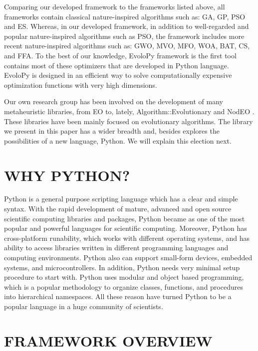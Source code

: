 \documentclass[a4paper,twoside]{article}
\begin{document}
Comparing our developed framework to the frameworks listed above, all
frameworks contain classical nature-inspired algorithms such as: GA,
GP, PSO and ES. Whereas, in our developed framework, in addition to
well-regarded and popular nature-inspired algorithms such as PSO, the
framework includes more recent nature-inspired algorithms such as:
GWO, MVO, MFO, WOA, BAT, CS, and FFA. To the best of our knowledge,
EvoloPy framework is the first tool contains most of these optimizers that are
developed in Python language. EvoloPy is designed in an efficient way
to solve computationally expensive optimization functions with very
high dimensions. 

Our own research group has been involved on the development of many
metaheuristic libraries, from EO \cite{EO:FEA2000} to, lately, {\sf
  Algorithm::Evolutionary} \cite{ae09} and NodEO
\cite{nodeo2014}. These libraries have been mainly focused on
evolutionary algorithms. The library we present in this paper has a
wider breadth and, besides explores the possibilities of a new
language, Python. We will explain this election next. 


\section{\uppercase{Why Python?}}

Python is a general purpose scripting language which has a clear and simple syntax. With the rapid development of mature, advanced  and open source scientific computing libraries and packages, Python became as one of the most popular and powerful languages for scientific computing.
Moreover, Python has cross-platform runability, which works with different operating systems, and has ability to access libraries written in different programming languages and computing environments. Python also can support small-form devices, embedded systems, and microcontrollers. In addition, Python needs very minimal setup procedure to start with. Python uses modular and object based programming, which is a popular methodology to organize classes, functions, and procedures into hierarchical namespaces. All these reason have turned Python to be a popular language in a huge community of scientists. 

\section{\uppercase{Framework Overview}}
\end{document}
